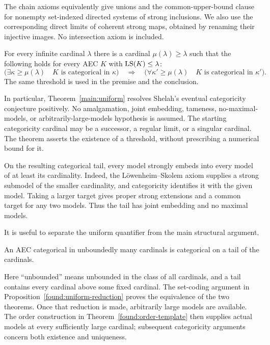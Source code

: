The chain axioms equivalently give unions and the common-upper-bound clause
for nonempty set-indexed directed systems of strong inclusions. We also use
the corresponding direct limits of coherent strong maps, obtained by
renaming their injective images. No intersection axiom is included.

\begin{theorem}\label{main:uniform}
For every infinite cardinal $\lambda$ there is a cardinal
$\mu(\lambda)\ge\lambda$ such that the following holds for every AEC $K$
with $\operatorname{LS}(K)\le\lambda$:
\[
  \bigl(\exists\kappa\ge\mu(\lambda)\quad K\text{ is categorical in }\kappa\bigr)
  \quad\Longrightarrow\quad
  \bigl(\forall\kappa'\ge\mu(\lambda)\quad
       K\text{ is categorical in }\kappa'\bigr).
\]
The same threshold is used in the premise and the conclusion.
\end{theorem}

In particular, Theorem~\ref{main:uniform} resolves Shelah's eventual
categoricity conjecture positively. No amalgamation, joint embedding,
tameness, no-maximal-models, or arbitrarily-large-models hypothesis is
assumed. The starting categoricity cardinal may be a successor, a regular
limit, or a singular cardinal. The theorem asserts the existence of a
threshold, without prescribing a numerical bound for it.

On the resulting categorical tail, every model strongly embeds into every
model of at least its cardinality. Indeed, the L\"owenheim--Skolem axiom
supplies a strong submodel of the smaller cardinality, and categoricity
identifies it with the given model. Taking a larger target gives proper
strong extensions and a common target for any two models. Thus the tail
has joint embedding and no maximal models.

It is useful to separate the uniform quantifier from the main structural
argument.

\begin{theorem}\label{main:qualitative}
An AEC categorical in unboundedly many cardinals is categorical on a tail of
the cardinals.
\end{theorem}

Here ``unbounded'' means unbounded in the class of all cardinals, and a tail
contains every cardinal above some fixed cardinal. The set-coding argument
in Proposition~\ref{found:uniform-reduction} proves the equivalence of the
two theorems. Once that reduction is made, arbitrarily large models are
available. The order construction in Theorem~\ref{found:order-template}
then supplies actual models at every sufficiently large cardinal; subsequent
categoricity arguments concern both existence and uniqueness.

